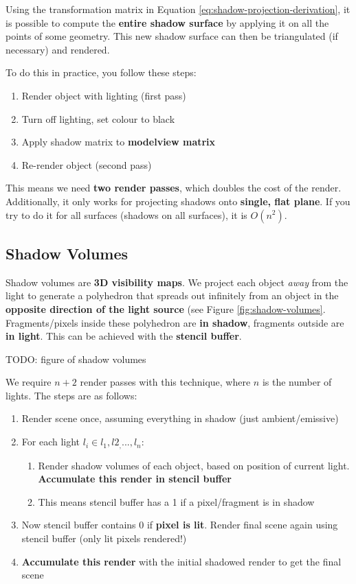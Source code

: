 \documentclass{article}
\begin{document}
Using the transformation matrix in Equation \ref{eq:shadow-projection-derivation}, it is possible to compute the \textbf{entire shadow surface} by applying it on all the points of some geometry. This new shadow surface can then be triangulated (if necessary) and rendered.

To do this in practice, you follow these steps:
\begin{enumerate}
	\item Render object with lighting (first pass)
	\item Turn off lighting, set colour to black
	\item Apply shadow matrix to \textbf{modelview matrix}
	\item Re-render object (second pass)
\end{enumerate}
This means we need \textbf{two render passes}, which doubles the cost  of the render. Additionally, it only works for projecting shadows onto \textbf{single, flat plane}. If you try to do it for all surfaces (shadows on all surfaces), it is $O(n^2)$.

\subsection{Shadow Volumes}

Shadow volumes are \textbf{3D visibility maps}. We project each object \textit{away} from the light to generate a polyhedron that spreads out infinitely from an object in the \textbf{opposite direction of the light source} (see Figure \ref{fig:shadow-volumes}. Fragments/pixels inside these polyhedron are \textbf{in shadow}, fragments outside are \textbf{in light}. This can be achieved with the \textbf{stencil buffer}.

TODO: figure of shadow volumes

We require $n+2$ render passes with this technique, where $n$ is the number of lights. The steps are as follows:
\begin{enumerate}
	\item Render scene once, assuming everything in shadow (just ambient/emissive)
	\item For each light $l_i \in l_1,l2_,...,l_n$:
	\begin{enumerate}
		\item Render shadow volumes of each object, based on position of current light. \textbf{Accumulate this render in stencil buffer}
		\item This means stencil buffer has a 1 if a pixel/fragment is in shadow
	\end{enumerate}
	\item Now stencil buffer contains 0 if \textbf{pixel is lit}. Render final scene again using stencil buffer (only lit pixels rendered!)
	\item \textbf{Accumulate this render} with the initial shadowed render to get the final scene
\end{enumerate}
\end{document}
